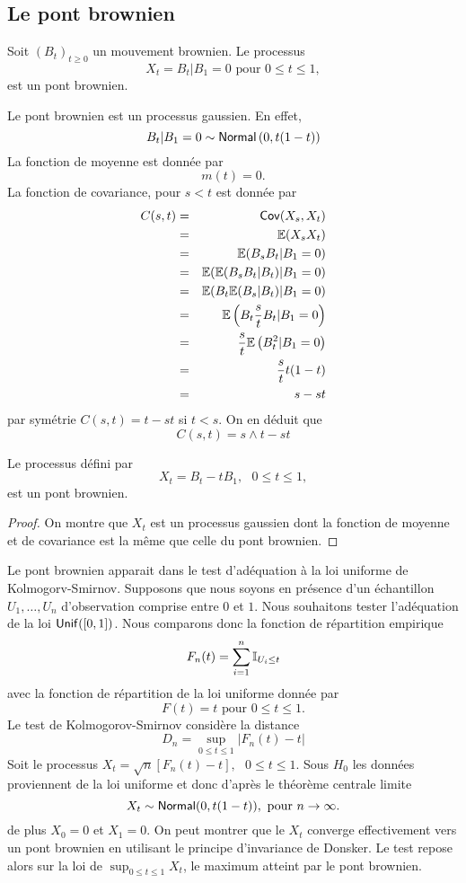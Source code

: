 \subsection{Le pont brownien}
\begin{definition}
Soit $(B_t)_{t\geq 0}$ un mouvement brownien. Le processus 
$$
X_t = B_t| B_1 = 0\text{ pour }0\leq t\leq 1,
$$
est un pont brownien. 
\end{definition}
Le pont brownien est un processus gaussien. En effet, 
$$
B_t|B_1 = 0\sim \mathsf{Normal}\left(0, t(1-t)\right)
$$
La fonction de moyenne est donnée par
$$
m(t) = 0.
$$
La fonction de covariance, pour $s< t$ est donnée par 
\begin{eqnarray*}
C(s,t)&=&\mathsf{Cov}(X_s, X_t)\\
&=&\mathbb{E}(X_s X_t)\\
&=&\mathbb{E}(B_s B_t|B_1 = 0)\\
&=&\mathbb{E}(\mathbb{E}(B_s B_t|B_t)|B_1 = 0)\\
&=&\mathbb{E}(B_t\mathbb{E}(B_s |B_t)|B_1 = 0)\\
&=&\mathbb{E}\left(B_t\frac{s}{t}B_t|B_1 = 0\right)\\
&=&\frac{s}{t}\mathbb{E}\left(B_t^2|B_1 = 0\right)\\
&=&\frac{s}{t}t(1-t)\\
&=&s-st\\
\end{eqnarray*}
par symétrie $C(s,t) = t-st$ si $t<s$. On en déduit que 
$$
C(s,t) = s\land t - st
$$
\begin{prop}
Le processus défini par 
$$
X_t = B_t - tB_1,\text{ }0\leq t\leq 1,
$$
est un pont brownien.
\end{prop}
\begin{proof}
On montre que $X_t$ est un processus gaussien dont la fonction de moyenne et de covariance est la même que celle du pont brownien. 
\end{proof}
\begin{ex}
Le pont brownien apparait dans le test d'adéquation à la loi uniforme de Kolmogorv-Smirnov. Supposons que nous soyons en présence d'un échantillon $U_1,\ldots, U_n$ d'observation comprise entre $0$ et $1$. Nous souhaitons tester l'adéquation de la loi $\mathsf{Unif}([0,1])$. Nous comparons donc la fonction de répartition empirique 
$$
F_n(t) = \sum_{i=1}^n\mathbb{I}_{U_i\leq t}
$$
avec la fonction de répartition de la loi uniforme donnée par 
$$
F(t) = t\text{ pour }0\leq t\leq 1.
$$
Le test de Kolmogorov-Smirnov considère la distance 
$$
D_n = \sup_{0\leq t\leq 1}|F_n(t)-t|
$$
Soit le processus $X_t = \sqrt{n}[F_n(t)-t],\text{ }0\leq t\leq 1$. Sous $H_0$ les données proviennent de la loi uniforme et donc d'après le théorème centrale limite 
$$
X_t\sim\mathsf{Normal}(0, t(1-t)),\text{ pour }n\rightarrow \infty.
$$
de plus $X_0 = 0$ et $X_1 = 0$. On peut montrer que le $X_t$ converge effectivement vers un pont brownien en utilisant le principe d'invariance de Donsker. Le test repose alors sur la loi de $\sup_{0\leq t\leq 1} X_t$, le maximum atteint par le pont brownien.
\end{ex}
